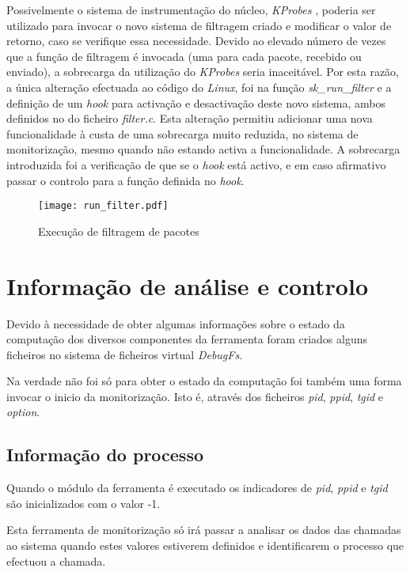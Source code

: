 Possivelmente o sistema de instrumentação do núcleo, \textit{KProbes} , poderia ser utilizado para invocar o novo sistema de filtragem criado e modificar o valor de retorno, caso se verifique essa necessidade.
Devido ao elevado número de vezes que a função de filtragem é invocada (uma para cada pacote, recebido ou enviado), a sobrecarga da utilização do \textit{KProbes} seria inaceitável.
Por esta razão, a única alteração efectuada ao código do \textit{Linux}, foi na função \textit{sk\_run\_filter} e a definição de um \textit{hook} para activação e desactivação deste novo sistema, ambos definidos no do ficheiro \textit{filter.c}.
Esta alteração permitiu adicionar uma nova funcionalidade à custa de uma sobrecarga muito reduzida, no sistema de monitorização, mesmo quando não estando activa a funcionalidade.
A sobrecarga introduzida foi a verificação de que se o \textit{hook} está activo, e em caso afirmativo passar o controlo para a função definida no \textit{hook}.

\begin{figure}[ht]
\centering
\texttt{[image: run\_filter.pdf]}
\caption{Execução de filtragem de pacotes}
\label{fig:run_filter}
\end{figure}


\section{Informação de análise e controlo}

Devido à necessidade de obter algumas informações sobre o estado da computação dos diversos componentes da ferramenta foram criados alguns ficheiros no
sistema de ficheiros virtual \textit{DebugFs}.

Na verdade não foi só para obter o estado da computação foi também uma forma invocar o inicio da monitorização.
 Isto é, através dos ficheiros \textit{pid}, \textit{ppid}, \textit{tgid} e \textit{option}. 

\subsection{Informação do processo}

Quando o módulo da ferramenta é executado os indicadores de \textit{pid}, \textit{ppid} e \textit{tgid} são inicializados com o valor -1.

Esta ferramenta de monitorização só irá passar a analisar os dados das chamadas ao sistema quando estes valores estiverem definidos e identificarem o processo que efectuou a chamada.

